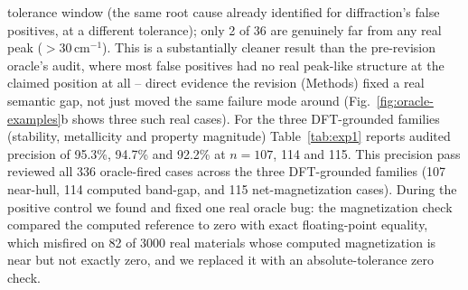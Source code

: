 \documentclass[pdflatex,sn-nature]{sn-jnl}
\begin{document}
tolerance window (the same root cause already identified for diffraction's false
positives, at a different tolerance); only 2 of 36 are genuinely far from any real peak
($>30\,\mathrm{cm}^{-1}$). This is a substantially cleaner result than the pre-revision
oracle's audit, where most false positives had no real peak-like structure at the claimed
position at all -- direct evidence the revision (Methods) fixed a real semantic gap, not
just moved the same failure mode around (Fig.~\ref{fig:oracle-examples}b shows three
such real cases). For the three DFT-grounded families (stability, metallicity and
property magnitude) Table~\ref{tab:exp1} reports audited precision of 95.3\%, 94.7\% and
92.2\% at $n=107$, 114 and 115. This precision pass reviewed all 336 oracle-fired cases across the three DFT-grounded families (107 near-hull, 114 computed band-gap, and 115 net-magnetization cases). During the positive control we found and fixed one real oracle bug: the magnetization check compared the computed reference to
zero with exact floating-point equality, which misfired on 82 of 3000 real materials whose computed magnetization is near but not exactly zero, and we replaced it with an absolute-tolerance zero check.


\end{document}
